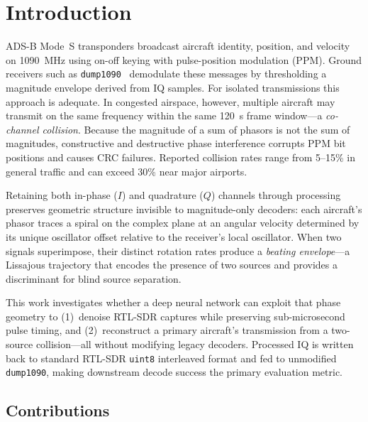 \documentclass[11pt,a4paper]{article}
\begin{document}
\section{Introduction}

ADS-B Mode~S transponders broadcast aircraft identity, position, and velocity
on 1090~MHz using on-off keying with pulse-position modulation (PPM). Ground
receivers such as \texttt{dump1090}~\cite{dump1090fa} demodulate these messages by thresholding a
magnitude envelope derived from IQ samples. For isolated transmissions this
approach is adequate. In congested airspace, however, multiple aircraft may
transmit on the same frequency within the same 120~\textmu s frame
window---a \emph{co-channel collision}. Because the magnitude of a sum of
phasors is not the sum of magnitudes, constructive and destructive phase
interference corrupts PPM bit positions and causes CRC failures. Reported
collision rates range from 5--15\% in general traffic and can exceed 30\% near
major airports.

Retaining both in-phase ($I$) and quadrature ($Q$) channels through processing
preserves geometric structure invisible to magnitude-only decoders: each
aircraft's phasor traces a spiral on the complex plane at an angular velocity
determined by its unique oscillator offset relative to the receiver's local
oscillator. When two signals superimpose, their distinct rotation rates produce
a \emph{beating envelope}---a Lissajous trajectory that encodes the presence of
two sources and provides a discriminant for blind source separation.

This work investigates whether a deep neural network can exploit that phase
geometry to (1)~denoise RTL-SDR captures while preserving sub-microsecond pulse
timing, and (2)~reconstruct a primary aircraft's transmission from a two-source
collision---all without modifying legacy decoders. Processed IQ is written back
to standard RTL-SDR \texttt{uint8} interleaved format and fed to unmodified
\texttt{dump1090}, making downstream decode success the primary evaluation
metric.

\subsection{Contributions}
\end{document}
